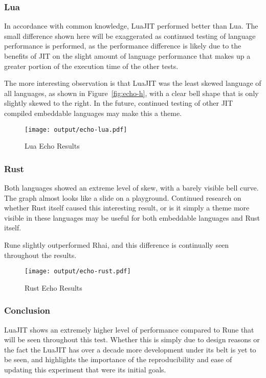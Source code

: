 \subsubsection{Lua}
In accordance with common knowledge, LuaJIT performed better than Lua. The small difference shown here will be exaggerated as continued testing of language performance is performed, as the performance difference is likely due to the benefits of JIT on the slight amount of language performance that makes up a greater portion of the execution time of the other tests.

The more interesting observation is that LuaJIT was the least skewed language of all languages, as shown in Figure~\ref{fig:echo-h}, with a clear bell shape that is only slightly skewed to the right. In the future, continued testing of other JIT compiled embeddable languages may make this a theme.

\begin{figure}[H]
	\centering
		\texttt{[image: output/echo-lua.pdf]}
	\caption{Lua Echo Results}
	\label{fig:echo-lua}
\end{figure}

\subsubsection{Rust}
Both languages showed an extreme level of skew, with a barely visible bell curve. The graph almost looks like a slide on a playground. Continued research on whether Rust itself caused this interesting result, or is it simply a theme more visible in these languages may be useful for both embeddable languages and Rust itself.

Rune slightly outperformed Rhai, and this difference is continually seen throughout the results.

\begin{figure}[H]
	\centering
		\texttt{[image: output/echo-rust.pdf]}
	\caption{Rust Echo Results}
	\label{fig:echo-rust}
\end{figure}

\subsubsection{Conclusion}
LuaJIT shows an extremely higher level of performance compared to Rune that will be seen throughout this test. Whether this is simply due to design reasons or the fact the LuaJIT has over a decade more development under its belt is yet to be seen, and highlights the importance of the reproducibility and ease of updating this experiment that were its initial goals.

